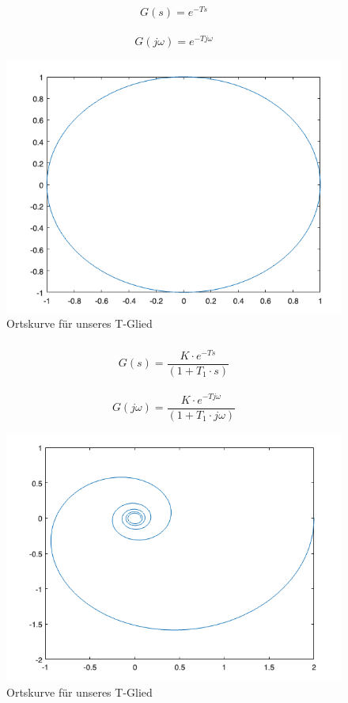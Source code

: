 \documentclass{article}
\begin{document}
			\subsubsection{}
				$$G(s) = e^{-Ts}$$
				\\
				$$G(j\omega) = e^{-Tj\omega}$$
				\begin{figure}[h]
					\includegraphics[scale = 0.6]{./Ortskurve_3_1.png}
					\caption{Ortskurve für unseres T-Glied}
					\label{fig3: Ortskurve}
				\end{figure}
\newpage
			\subsubsection{}
				$$G(s) = \frac{K\cdot e^{-Ts}}{(1+T_1\cdot s)}$$
				\\
				$$G(j\omega) = \frac{K\cdot e^{-Tj\omega}}{(1+T_1\cdot j\omega)}$$
				\begin{figure}[h]
					\includegraphics[scale = 0.7]{./Ortskurve_3_2.png}
					\caption{Ortskurve für unseres T-Glied}
					\label{fig3: Ortskurve}
				\end{figure}
\newpage
\end{document}
